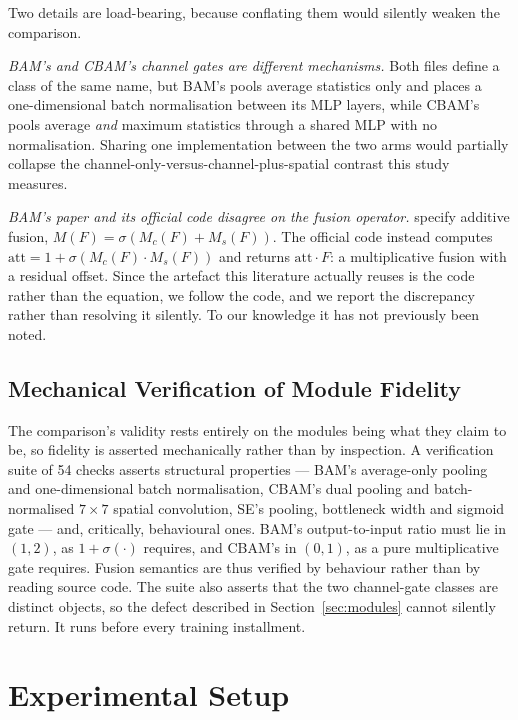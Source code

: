 \documentclass[10pt]{article}
\begin{document}
Two details are load-bearing, because conflating them would silently weaken the
comparison.

\emph{BAM's and CBAM's channel gates are different mechanisms.} Both files
define a class of the same name, but BAM's pools average statistics only and
places a one-dimensional batch normalisation between its MLP layers, while
CBAM's pools average \emph{and} maximum statistics through a shared MLP with no
normalisation. Sharing one implementation between the two arms would partially
collapse the channel-only-versus-channel-plus-spatial contrast this study
measures.

\emph{BAM's paper and its official code disagree on the fusion operator.}
\citet{park2018bam} specify additive fusion,
$M(F) = \sigma(M_c(F) + M_s(F))$. The official code instead computes
$\mathrm{att} = 1 + \sigma(M_c(F) \cdot M_s(F))$ and returns
$\mathrm{att} \cdot F$: a multiplicative fusion with a residual offset. Since
the artefact this literature actually reuses is the code rather than the
equation, we follow the code, and we report the discrepancy rather than
resolving it silently. To our knowledge it has not previously been noted.

\subsection{Mechanical Verification of Module Fidelity}
\label{sec:verification}

The comparison's validity rests entirely on the modules being what they claim to
be, so fidelity is asserted mechanically rather than by inspection. A
verification suite of 54 checks asserts structural properties --- BAM's
average-only pooling and one-dimensional batch normalisation, CBAM's dual
pooling and batch-normalised $7\times7$ spatial convolution, SE's pooling,
bottleneck width and sigmoid gate --- and, critically, behavioural ones. BAM's
output-to-input ratio must lie in $(1,2)$, as $1 + \sigma(\cdot)$ requires, and
CBAM's in $(0,1)$, as a pure multiplicative gate requires. Fusion semantics are
thus verified by behaviour rather than by reading source code. The suite also
asserts that the two channel-gate classes are distinct objects, so the defect
described in Section~\ref{sec:modules} cannot silently return. It runs before
every training installment.

\section{Experimental Setup}
\label{sec:setup}
\end{document}
